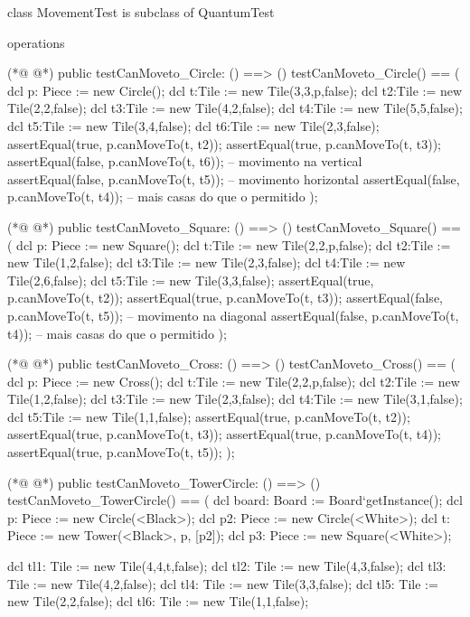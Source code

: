 \begin{vdmpp}[breaklines=true]
class MovementTest is subclass of QuantumTest

operations  

(*@
\label{testCanMoveto:Circle:5}
@*)
  public testCanMoveto_Circle: () ==> ()
  testCanMoveto_Circle() == (
   dcl p: Piece := new Circle();
   dcl t:Tile := new Tile(3,3,p,false);
   dcl t2:Tile := new Tile(2,2,false);
   dcl t3:Tile := new Tile(4,2,false);
   dcl t4:Tile := new Tile(5,5,false);
   dcl t5:Tile := new Tile(3,4,false);
   dcl t6:Tile := new Tile(2,3,false);
   assertEqual(true, p.canMoveTo(t, t2));
   assertEqual(true, p.canMoveTo(t, t3));
   assertEqual(false, p.canMoveTo(t, t6)); -- movimento na vertical
   assertEqual(false, p.canMoveTo(t, t5)); -- movimento horizontal
   assertEqual(false, p.canMoveTo(t, t4)); -- mais casas do que o permitido
  );
  
(*@
\label{testCanMoveto:Square:21}
@*)
  public testCanMoveto_Square: () ==> ()
  testCanMoveto_Square() == (
   dcl p: Piece := new Square();
   dcl t:Tile := new Tile(2,2,p,false);
   dcl t2:Tile := new Tile(1,2,false);
   dcl t3:Tile := new Tile(2,3,false);
   dcl t4:Tile := new Tile(2,6,false);
   dcl t5:Tile := new Tile(3,3,false);
   assertEqual(true, p.canMoveTo(t, t2));
   assertEqual(true, p.canMoveTo(t, t3));
   assertEqual(false, p.canMoveTo(t, t5)); -- movimento na diagonal
   assertEqual(false, p.canMoveTo(t, t4)); -- mais casas do que o permitido
  );
  
(*@
\label{testCanMoveto:Cross:35}
@*)
  public testCanMoveto_Cross: () ==> ()
  testCanMoveto_Cross() == (
   dcl p: Piece := new Cross();
   dcl t:Tile := new Tile(2,2,p,false);
   dcl t2:Tile := new Tile(1,2,false);
   dcl t3:Tile := new Tile(2,3,false);
   dcl t4:Tile := new Tile(3,1,false);
   dcl t5:Tile := new Tile(1,1,false);
   assertEqual(true, p.canMoveTo(t, t2));
   assertEqual(true, p.canMoveTo(t, t3));
   assertEqual(true, p.canMoveTo(t, t4));
   assertEqual(true, p.canMoveTo(t, t5));
  );
  
(*@
\label{testCanMoveto:TowerCircle:49}
@*)
  public testCanMoveto_TowerCircle: () ==> ()
  testCanMoveto_TowerCircle() == (
   dcl board: Board := Board`getInstance();
   dcl p: Piece := new Circle(<Black>);
   dcl p2: Piece := new Circle(<White>);
   dcl t: Piece := new Tower(<Black>, p, [p2]);
   dcl p3: Piece := new Square(<White>);
      
   dcl tl1: Tile := new Tile(4,4,t,false);
   dcl tl2: Tile := new Tile(4,3,false);
   dcl tl3: Tile := new Tile(4,2,false);
   dcl tl4: Tile := new Tile(3,3,false);
   dcl tl5: Tile := new Tile(2,2,false);
   dcl tl6: Tile := new Tile(1,1,false);
 

\end{vdmpp}
